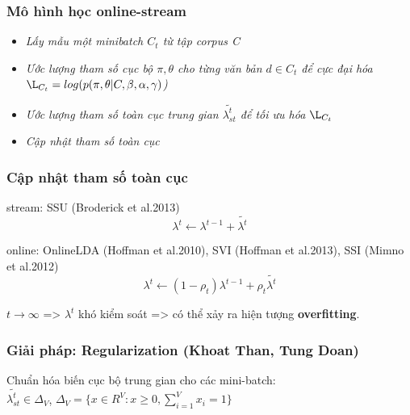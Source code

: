 \documentclass{beamer}
\begin{document}
\begin{frame}
\frametitle{Mô hình học online-stream}
\begin{itemize}
\item \textit{Lấy mẫu một minibatch $C_t$ từ tập corpus C}
\item \textit{Ước lượng tham số cục bộ $\pi, \theta$ cho từng văn bản $d \in C_t$ để cực đại hóa $\L_{C_t} = log(p(\pi,\theta|C, \beta, \alpha, \gamma)$)}
\item \textit{Ước lượng tham số toàn cục trung gian $\tilde{\lambda_{st}^t}$ để tối ưu hóa $\L_{C_t}$}
\item \textit{Cập nhật tham số toàn cục}
\end{itemize}
\end{frame}
	

\begin{frame}
\frametitle{Cập nhật tham số toàn cục}
\begin{block}{stream: SSU (Broderick et al.2013)}
\begin{equation}
\lambda^t \leftarrow \lambda^{t-1} + \tilde{\lambda^t}
\end{equation}
\end{block}
\begin{block}{online: OnlineLDA (Hoffman et al.2010), SVI (Hoffman et al.2013), SSI (Mimno et al.2012)}
\begin{equation}
\lambda^t \leftarrow (1 - \rho_t)\lambda^{t-1} + \rho_t\tilde{\lambda^t}
\end{equation}
\end{block}
$t \rightarrow \infty$ => $\lambda^t$ khó kiểm soát => có thể xảy ra hiện tượng \textbf{overfitting}.
\end{frame}

\begin{frame}
\frametitle{Giải pháp: Regularization (Khoat Than, Tung Doan)}
Chuẩn hóa biến cục bộ trung gian cho các mini-batch:\\
$\tilde{\lambda_{st}^t} \in \Delta_V$, $\Delta_V = \{x \in R^V: x \geq 0,  \sum_{i=1}^{V}x_i=1\}$
\end{frame}

\end{document}
